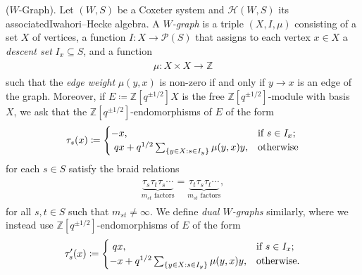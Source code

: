 \begin{definition}\textup{($W$-Graph).} Let $(W, S)$ be a Coxeter system and $\mathscr{H}(W, S)$ its associated\linebreak Iwahori--Hecke algebra. A {\em $W$-graph} is a triple $(X, I, \mu)$ consisting of a set $X$ of vertices, a function $I : X \to \mathscr{P}(S)$ that assigns to each vertex $x \in X$ a {\em descent set} $I_x \subseteq S$, and a function
\begin{align*}
\begin{split}
\mu : X \times X \to \mathbb{Z}
\end{split}
\end{align*}
\noindent such that the {\em edge weight} $\mu(y, x)$ is non-zero if and only if $y \to x$ is an edge of the graph. Moreover, if $E \coloneqq \mathbb{Z}[q^{\pm 1/2}]X$ is the free $\mathbb{Z}[q^{\pm 1/2}]$-module with basis $X$, we ask that the $\mathbb{Z}[q^{\pm 1/2}]$-endomorphisms of $E$ of the form
\begin{align*}
\begin{split}
\tau_s(x) \coloneqq \begin{cases}
-x, &\text{if $s \in I_x$;}\\
\nhphantom{$q$}\hphantom{-}qx + q^{1/2}\sum_{\{y \in X : s \in I_y\}} \mu(y, x)y, &\text{otherwise}
\end{cases}
\end{split}
\end{align*}
\noindent for each $s \in S$ satisfy the braid relations
\begin{align*}
\begin{split}
\underbrace{\tau_s\tau_t\tau_s\cdots}_\text{$m_{st}$ factors} = \underbrace{\tau_t\tau_s\tau_t\cdots}_\text{$m_{st}$ factors},
\end{split}
\end{align*}
\noindent for all $s, t \in S$ such that $m_{st} \neq \infty$. We define {\em dual $W$-graphs} similarly, where we instead use $\mathbb{Z}[q^{\pm 1/2}]$-endomorphisms of $E$ of the form
\begin{align*}
\begin{split}
\tau_s'(x) \coloneqq \begin{cases}
\nhphantom{$q$}\hphantom{-}qx, &\text{if $s \in I_x$;}\\
-x + q^{1/2}\sum_{\{y \in X : s \in I_y\}} \mu(y, x)y, &\text{otherwise.}
\end{cases}
\end{split}
\end{align*}
\end{definition}
\newpage

